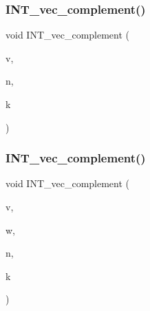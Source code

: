 \subsubsection{\texorpdfstring{I\+N\+T\+\_\+vec\+\_\+complement()}{INT\_vec\_complement()}\hspace{0.1cm}{\footnotesize\ttfamily [1/2]}}
{\footnotesize\ttfamily void I\+N\+T\+\_\+vec\+\_\+complement (\begin{DoxyParamCaption}\item[{\mbox{\hyperlink{galois_8h_a09fddde158a3a20bd2dcadb609de11dc}{I\+NT}} $\ast$}]{v,  }\item[{\mbox{\hyperlink{galois_8h_a09fddde158a3a20bd2dcadb609de11dc}{I\+NT}}}]{n,  }\item[{\mbox{\hyperlink{galois_8h_a09fddde158a3a20bd2dcadb609de11dc}{I\+NT}}}]{k }\end{DoxyParamCaption})}

\mbox{\label{util_8_c_a077b675082e70402fdbdf85034e1df4d}} 
\subsubsection{\texorpdfstring{I\+N\+T\+\_\+vec\+\_\+complement()}{INT\_vec\_complement()}\hspace{0.1cm}{\footnotesize\ttfamily [2/2]}}
{\footnotesize\ttfamily void I\+N\+T\+\_\+vec\+\_\+complement (\begin{DoxyParamCaption}\item[{\mbox{\hyperlink{galois_8h_a09fddde158a3a20bd2dcadb609de11dc}{I\+NT}} $\ast$}]{v,  }\item[{\mbox{\hyperlink{galois_8h_a09fddde158a3a20bd2dcadb609de11dc}{I\+NT}} $\ast$}]{w,  }\item[{\mbox{\hyperlink{galois_8h_a09fddde158a3a20bd2dcadb609de11dc}{I\+NT}}}]{n,  }\item[{\mbox{\hyperlink{galois_8h_a09fddde158a3a20bd2dcadb609de11dc}{I\+NT}}}]{k }\end{DoxyParamCaption})}

\mbox{\label{util_8_c_ac2d875e27e009af6ec04d17254d11075}} 
